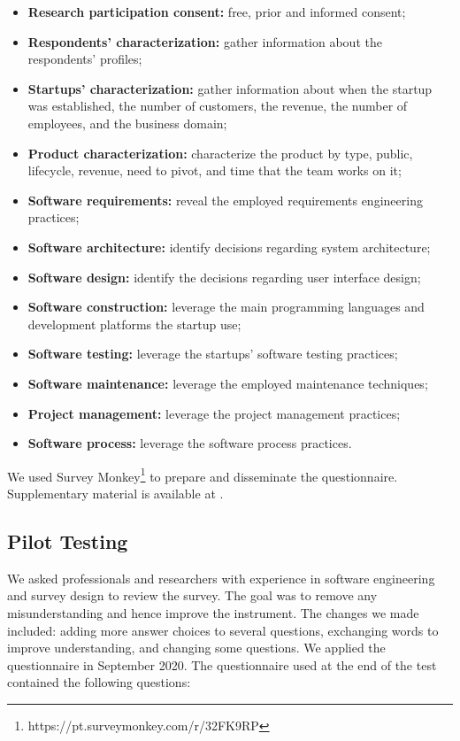 \documentclass[runningheads]{llncs}
\begin{document}
\begin{itemize}
    \item \textbf{Research participation consent:} free, prior and informed consent;
    \item \textbf{Respondents' characterization:} gather information about the respondents' profiles;
    \item \textbf{Startups' characterization:} gather information about when the startup was established, the number of customers, the revenue, the number of employees, and the business domain;
    \item \textbf{Product characterization:} characterize the product by type, public, lifecycle, revenue, need to pivot, and time that the team works on it;
    \item \textbf{Software requirements:} reveal the employed requirements engineering practices;
    \item \textbf{Software architecture:} identify decisions regarding system architecture;
    \item \textbf{Software design:} identify the decisions regarding user interface design;
    \item \textbf{Software construction:} leverage the main programming languages and development platforms the startup use;
    \item \textbf{Software testing:} leverage the startups' software testing practices;
    \item \textbf{Software maintenance:} leverage the employed maintenance techniques;
    \item \textbf{Project management:} leverage the project management practices;
    \item \textbf{Software process:} leverage the software process practices.
\end{itemize}

We used Survey Monkey\footnote{https://pt.surveymonkey.com/r/32FK9RP} to prepare and disseminate the questionnaire. Supplementary material is available at \cite{souza2021cibse}.


\subsection{Pilot Testing}
\label{subsection:testingsurvey}

We asked professionals and researchers with experience in software engineering and survey design to review the survey. The goal was to remove any misunderstanding and hence improve the instrument. The changes we made included: adding more answer choices to several questions, exchanging words to improve understanding, and changing some questions. We applied the questionnaire in September 2020. The questionnaire used at the end of the test contained the following questions:
\end{document}
